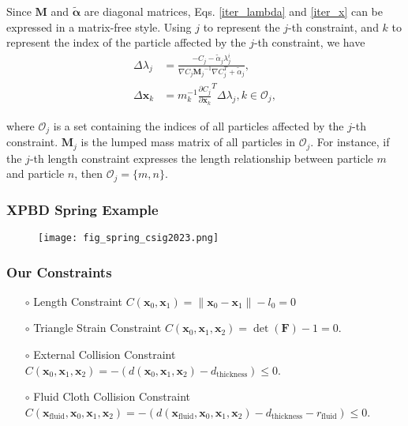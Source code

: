 \begin{frame}
Since $\mathbf{M}$ and $\tilde{\boldsymbol{\alpha}}$ are diagonal matrices, Eqs. \ref{iter_lambda} and \ref{iter_x} can be expressed in a matrix-free style. Using $j$ to represent the $j$-th constraint, and $k$ to represent the index of the particle affected by the $j$-th constraint, we have
\begin{align}
    \Delta \lambda_j &=\frac{-C_j -\tilde{\alpha}_j \lambda^i_j}{\nabla C_j {\mathbf{M}_j}^{-1} \nabla C_j^T+\tilde{\alpha}_j}, \label{delta_lambda}\\
    \Delta \mathbf{x}_k &= m_k^{-1} {\frac{\partial C_j}{\partial \mathbf{x}_k}}^T \Delta \lambda_j, k \in \mathcal{O}_j, \label{delta_x}
\end{align}

where $\mathcal{O}_j$ is a set containing the indices of all particles affected by the $j$-th constraint. $\mathbf{M}_j$ is the lumped mass matrix of all particles in $\mathcal{O}_j$. For instance, if the $j$-th length constraint expresses the length relationship between particle $m$ and particle $n$, then $\mathcal{O}_j=\{m, n\}$.
\end{frame}

\begin{frame}
    \frametitle{XPBD Spring Example}
    \begin{figure}[H]
        \centering
        \texttt{[image: fig\_spring\_csig2023.png]}
    \end{figure}
\end{frame}

\begin{frame}
    \frametitle{Our Constraints}
    \begin{itemize}
        \item [$\circ$] Length Constraint $C(\mathbf{x}_0, \mathbf{x}_1) = \| \mathbf{x}_0 - \mathbf{x}_1\| - l_0 = 0$
        \item [$\circ$] Triangle Strain Constraint $C\left(\mathbf{x}_{0}, \mathbf{x}_{1}, \mathbf{x}_{2}\right)=\operatorname{det}(\mathbf{F})-1=0$.
        \item [$\circ$] External Collision Constraint $C\left(\mathbf{x}_{0}, \mathbf{x}_{1}, \mathbf{x}_{2}\right)=-\left(d\left(\mathbf{x}_{0}, \mathbf{x}_{1}, \mathbf{x}_{2}\right)-d_{\text{thickness}}\right) \leq 0$.
        \item [$\circ$] Fluid Cloth Collision Constraint $C\left(\mathbf{x}_{\text{fluid}},\mathbf{x}_{0}, \mathbf{x}_{1}, \mathbf{x}_{2}\right)=-\left(d\left(\mathbf{x}_{\text{fluid}},\mathbf{x}_{0}, \mathbf{x}_{1}, \mathbf{x}_{2}\right)-d_{\text{thickness}}-r_{\text{fluid}}\right) \leq 0$.
    \end{itemize}
\end{frame}

